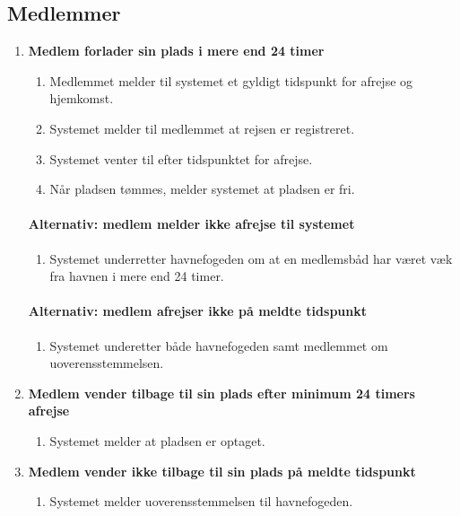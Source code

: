\subsection{Medlemmer}  
  \begin{enumerate}

    \item{\bf{Medlem forlader sin plads i mere end 24 timer}}
      \begin{enumerate}
        \item Medlemmet melder til systemet et gyldigt tidspunkt for afrejse og hjemkomst.
        \item Systemet melder til medlemmet at rejsen er registreret.
        \item Systemet venter til efter tidspunktet for afrejse.
        \item Når pladsen tømmes, melder systemet at pladsen er fri.
      \end{enumerate}

    \paragraph{Alternativ: medlem melder ikke afrejse til systemet}
      \begin{enumerate}
        \item Systemet underretter havnefogeden om at en medlemsbåd har været væk fra havnen i mere end 24 timer.
      \end{enumerate}

    \paragraph{Alternativ: medlem afrejser ikke på meldte tidspunkt}
      \begin{enumerate}
        \item Systemet underetter både havnefogeden samt medlemmet om uoverensstemmelsen.
      \end{enumerate}


    \item{\bf{Medlem vender tilbage til sin plads efter minimum 24 timers afrejse}}
      \begin{enumerate}
        \item Systemet melder at pladsen er optaget.
      \end{enumerate}


    \item{\bf{Medlem vender ikke tilbage til sin plads på meldte tidspunkt}}
      \begin{enumerate}
        \item Systemet melder uoverensstemmelsen til havnefogeden.
      \end{enumerate}



\end{enumerate}
